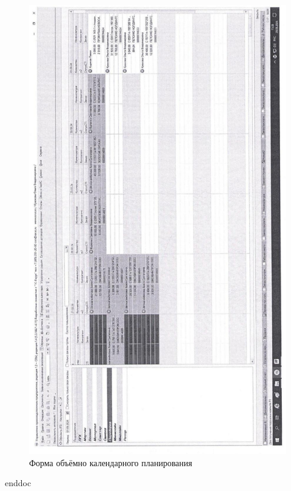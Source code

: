 \begin{figure}
\begin{center}
 \includegraphics[height=0.8\textheight, keepaspectratio]{Pics/d10.jpg}
\end{center}
 \caption{Форма объёмно календарного планирования}
 \label{pic:d10}
\end{figure}





\clearpage
 {enddoc}